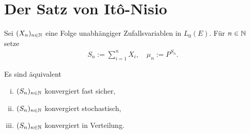 \section{Der Satz von Itô-Nisio}
    Sei $(X_n)_{n \in \mathbb{N}}$ eine Folge unabhängiger Zufallsvariablen in $L_0(E)$. Für $n \in \mathbb{N}$ setze
    \begin{align*}
    S_n := \sum_{i=1}^n X_i, 
    \quad 
    \mu_n := P^{S_n} .
    \end{align*}
\begin{theorem}
    Es sind äquivalent
    \begin{enumerate}[(i)]
        \item $(S_n)_{n \in \mathbb{N}}$ konvergiert fast sicher, 
        \item $(S_n)_{n \in \mathbb{N}}$ konvergiert stochastisch, 
        \item $(S_n)_{n \in \mathbb{N}}$ konvergiert in Verteilung. 
    \end{enumerate}
\end{theorem}

